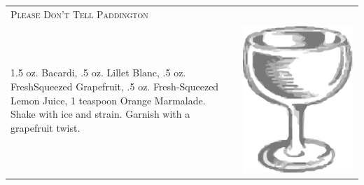 \documentclass{article}
\begin{document}
\begin{tabular}{p{2in} p{0.5in}}
  \multicolumn{2}{p{3in}}{\centering\Huge\textsc{Please Don't Tell Paddington}} \\ 
  
   \vspace{-0.1in}1.5 oz. Bacardi, .5 oz. Lillet Blanc, .5 oz. FreshSqueezed
    Grapefruit, .5 oz. Fresh-Squeezed Lemon Juice, 1 teaspoon Orange
    Marmalade. Shake with ice and strain. Garnish with a grapefruit
    twist. &  \vspace{-0.1in} \includegraphics{coupe.png}
\end{tabular}
\end{document}
